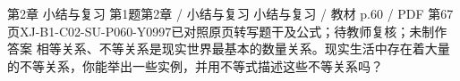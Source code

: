 \par\noindent\begin{minipage}{\linewidth}
\begin{bankitem}{第2章 小结与复习 第1题}{第2章 / 小结与复习 小结与复习 / 教材 p.60 / PDF 第67页}{XJ-B1-C02-SU-P060-Y0997}{已对照原页转写题干及公式；待教师复核；未制作答案}
相等关系、不等关系是现实世界最基本的数量关系。现实生活中存在着大量的不等关系，你能举出一些实例，并用不等式描述这些不等关系吗？
\end{bankitem}
\end{minipage}\par\medskip

